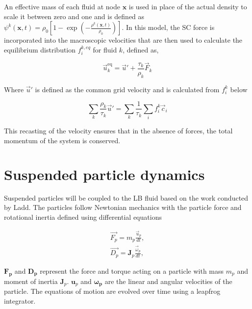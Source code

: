 An effective mass of each fluid at node $\mathbf{x}$ is used in place of the actual density to scale it between zero 
and one and is defined as $\psi^{k}(\mathbf{x},t) = \rho_{0}\left[1 - \exp(-\frac{\rho^{k}(\mathbf{x}, t)}{\rho_{0}})\right]$. 
In this model, the SC force is incorporated into the macroscopic velocities that are then used to calculate the equilibrium
distribution $f_{i}^{k, eq}$ for fluid $k$, defined as,

\begin{equation}
\vec{u}_k^{\text{eq}} = \vec{u}' + \frac{\tau_k}{\rho_k} \vec{F}_k
\end{equation}

Where $\vec{u}'$ is defined as the common grid velocity and is calculated from $f_i^k$ below

\begin{equation}
    \sum_k \frac{\rho_k}{\tau_k} \vec{u}' = \sum_k \frac{1}{\tau_k}\sum_i f_i^k\vec{c}_i
\end{equation}

This recasting of the velocity ensures that in the absence of forces, the total momentum of the system is conserved. 


\section{Suspended particle dynamics}
\label{section:lbm_colloids}

Suspended particles will be coupled to the LB fluid based on the work conducted by Ladd. \cite{ladd_numerical_1994, 
aidun_direct_1998, ladd_lattice-boltzmann_2001} The particles follow Newtonian mechanics with the particle force and
rotational inertia defined using differential equations

\begin{equation}
    \begin{split}
    \vec{F_p} = m_p \frac{\vec{u}_p}{dt} , \\
    \vec{D_p} = \mathbf{J}_p \frac{\vec{\omega}_p}{dt} ,
    \label{eq:md}
    \end{split}
\end{equation}

$\mathbf{F_p}$ and $\mathbf{D_p}$ represent the force and torque acting on a particle with mass $m_p$ and moment of inertia 
$\mathbf{J}_p$. $\mathbf{u}_p$ and $\mathbf{\omega_{p}}$ are the linear and angular velocities of the particle. The equations of 
motion are evolved over time using a leapfrog integrator. \cite{jansen_bijels_2011}

